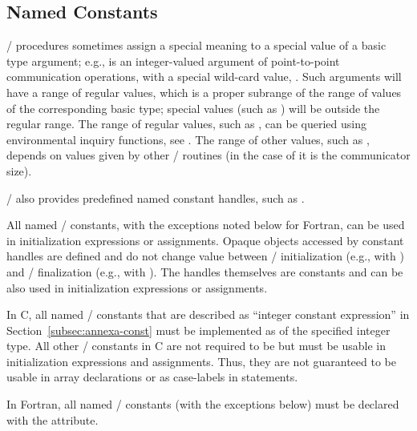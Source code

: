 \subsection{Named Constants}
\label{subsec:named-constants}

\MPI/ procedures sometimes assign a special meaning to a special value of a
basic type argument; e.g.,  is an integer-valued argument of
point-to-point communication operations, with a special wild-card
value, .
Such arguments will have a range of regular values, which is a proper
subrange
of the range of values of the corresponding basic type;
special values (such as )
will be outside the regular range.
The range of regular values, such as , can
be queried using environmental inquiry
functions, see .
The range of other values, such as , depends on values given by
other \mpi/ routines (in the case of  it is the communicator
size).

\MPI/ also provides predefined named constant handles, such as
.

All named \MPI/
constants, with the exceptions noted below for Fortran, can be used in
initialization expressions or assignments.
Opaque objects accessed by constant
handles are defined and do not change value between \MPI/ initialization
(e.g., with ) and \MPI/ finalization (e.g., with ).
The handles themselves are constants and can be also used in initialization expressions or assignments.

In C, all named \MPI/ constants that are described as ``integer constant expression'' in Section~\ref{subsec:annexa-const} must be implemented
as  of the specified integer type.
All other \MPI/ constants in C are not required to be  but must be usable in initialization expressions and assignments.
Thus, they are not guaranteed to be usable in array declarations or as case-labels in  statements.

In Fortran, all named \MPI/ constants (with the exceptions below) must be declared with the  attribute.

\label{subsec:named-constants:F_STATUS_SIZE}


